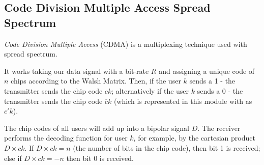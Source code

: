 

\subsection{Code Division Multiple Access Spread Spectrum}
\textit{Code Division Multiple Access} (CDMA) is a multiplexing technique used with spread spectrum.

It works taking our data signal with a bit-rate $R$ and assigning a unique code of $n$ chips according to the Walsh Matrix. Then, if the user $k$ sends a 1 - the transmitter sends the chip code $ck$; alternatively if the user $k$ sends a 0 - the transmitter sends the chip code $\overline{c}k$ (which is represented in this module with as $c'k$). 

The chip codes of all users will add up into a bipolar signal $D$. The receiver performs the decoding function for user $k$, for example, by the cartesian product $D\times ck$. If $D\times ck = n$ (the number of bits in the chip code), then bit 1 is received; else if $D\times ck=-n$ then bit 0 is received.

